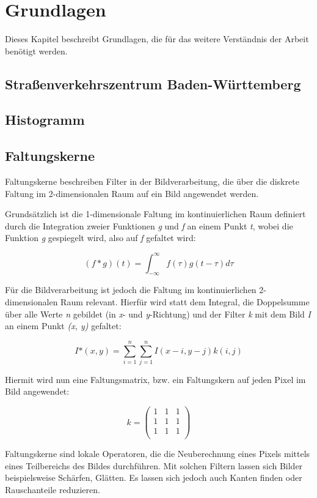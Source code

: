 \chapter{Grundlagen}

Dieses Kapitel beschreibt Grundlagen, die für das weitere Verständnis der Arbeit benötigt werden.

\section{Straßenverkehrszentrum Baden-Württemberg} %

\section{Histogramm} %

\section{Faltungskerne} %
Faltungskerne beschreiben Filter in der Bildverarbeitung, die über die diskrete Faltung im 2-dimensionalen
Raum auf ein Bild angewendet werden.


Grundsätzlich ist die 1-dimensionale Faltung im kontinuierlichen Raum definiert durch die Integration zweier Funktionen {\em g} und {\em f} an einem Punkt {\em t}, wobei die Funktion {\em g} gespiegelt wird, also auf {\em f} gefaltet wird:

$$ (f * g)(t) = \int_{-\infty}^{\infty} f(\tau)g(t - \tau) d\tau $$

Für die Bildverarbeitung ist jedoch die Faltung im kontinuierlichen 2-dimensionalen Raum relevant.
Hierfür wird statt dem Integral, die Doppelsumme über alle Werte {\em n} gebildet (in {\em x}- und {\em y}-Richtung) und der Filter {\em k} mit dem Bild {\em I} an einem Punkt {\em (x, y)} gefaltet:

$$ I\mbox{*}(x, y) = \sum_{i=1}^{n}\sum_{j=1}^{n} I(x - i, y - j)k(i, j) $$

Hiermit wird nun eine Faltungsmatrix, bzw. ein Faltungskern auf jeden Pixel im Bild angewendet:

$$ k = \left( \begin{array}{rrr}
1 & 1 & 1 \\
1 & 1 & 1 \\
1 & 1 & 1 \\
\end{array}\right) $$

Faltungskerne sind lokale Operatoren, die die Neuberechnung eines Pixels mittels eines Teilbereichs des Bildes durchführen.
Mit solchen Filtern lassen sich Bilder beispielsweise Schärfen, Glätten. Es lassen sich jedoch auch Kanten finden oder Rauschanteile reduzieren.

